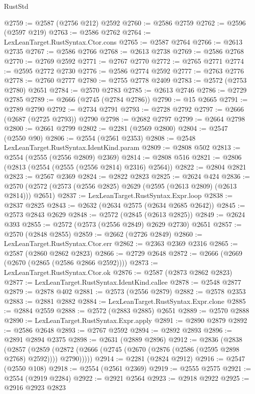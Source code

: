 \begin{lexlean}{RustStd}
\begin{coremodule}
@2759 := @2587 (@2756 @212) @2592
@2760 := @2586 @2759
@2762 := @2596 (@2597 @219)
@2763 := @2586 @2762
@2764 := LexLeanTarget.RustSyntax.Ctor.cons
@2765 := @2587 @2764
@2766 := @2613 @2735
@2767 := @2586 @2766
@2768 := @2613 @2738
@2769 := @2586 @2768
@2770 := @2769 @2592
@2771 := @2767 @2770
@2772 := @2765 @2771
@2774 := @2595 @2772 @2730
@2776 := @2586 @2774 @2592
@2777 := @2763 @2776
@2778 := @2760 @2777
@2780 := @2755 @2778 @2409
@2783 := @2572 (@2753 @2780) @2651
@2784 := @2570 @2783
@2785 := @2613 @2746
@2786 := @2729 @2785
@2789 := @2666 (@2745 (@2784 @2786))
@2790 := @15 @2665
@2791 := @2789 @2790
@2792 := @2734 @2791
@2793 := @2728 @2792
@2797 := @2666 (@2687 (@2725 @2793)) @2790
@2798 := @2682 @2797
@2799 := @2664 @2798
@2800 := @2661 @2799
@2802 := @2281 (@2569 @2800)
@2804 := @2547 (@2550 @90)
@2806 := @2554 (@2561 @2353)
@2808 := @2548 LexLeanTarget.RustSyntax.IdentKind.param
@2809 := @2808 @502
@2813 := @2554 (@2555 (@2556 @2809) @2369)
@2814 := @2808 @516
@2821 := @2806 (@2813 (@2554 (@2555 (@2556 @2814) @2316) @2564))
@2822 := @2804 @2821
@2823 := @2567 @2369
@2824 := @2822 @2823
@2825 := @2624 @424
@2836 := @2570 (@2572 (@2573 (@2556 @2825) @2629 (@2595 (@2613 @2809) (@2613 @2814))) @2651)
@2837 := LexLeanTarget.RustSyntax.Expr.loop
@2838 := @2837 @2825
@2843 := @2632 (@2634 @2575 (@2634 @2685 @2642))
@2845 := @2573 @2843 @2629
@2848 := @2572 (@2845 (@2613 @2825))
@2849 := @2624 @393
@2855 := @2572 (@2573 (@2556 @2849) @2629 @2730) @2651
@2857 := @2570 (@2848 @2855)
@2859 := @2662 (@2726 @2849)
@2860 := LexLeanTarget.RustSyntax.Ctor.err
@2862 := @2363 @2369 @2316
@2865 := @2587 (@2860 @2862 @2823)
@2866 := @2729 @2648
@2872 := @2666 (@2669 (@2670 (@2865 (@2586 @2866 @2592))))
@2873 := LexLeanTarget.RustSyntax.Ctor.ok
@2876 := @2587 (@2873 @2862 @2823)
@2877 := LexLeanTarget.RustSyntax.IdentKind.callee
@2878 := @2548 @2877
@2879 := @2878 @402
@2881 := @2573 (@2556 @2879)
@2882 := @2578 @2353
@2883 := @2881 @2882
@2884 := LexLeanTarget.RustSyntax.Expr.clone
@2885 := @2884 @2559
@2888 := @2572 (@2883 @2885) @2651
@2889 := @2570 @2888
@2890 := LexLeanTarget.RustSyntax.Expr.apply
@2891 := @2890 @2879
@2892 := @2586 @2648
@2893 := @2767 @2592
@2894 := @2892 @2893
@2896 := @2891 @2894 @2375
@2898 := @2631 (@2889 @2896)
@2912 := @2836
    (@2838
      (@2857
        (@2859 (@2872 (@2666 (@2745 (@2670 (@2876 (@2586 (@2595 @2898 @2768) @2592)))) @2790)))))
@2914 := @2281 (@2824 @2912)
@2916 := @2547 (@2550 @108)
@2918 := @2554 (@2561 @2369)
@2919 := @2555 @2575
@2921 := @2554 (@2919 @2284)
@2922 := @2921 @2564
@2923 := @2918 @2922
@2925 := @2916 @2923 @2823

\end{coremodule}
\end{lexlean}
